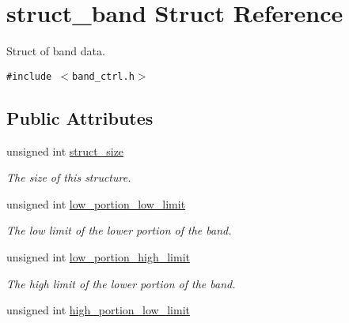 \hypertarget{structstruct__band}{
\section{struct\_\-band Struct Reference}
\label{structstruct__band}
}
Struct of band data.  


{\tt \#include $<$band\_\-ctrl.h$>$}

\subsection*{Public Attributes}
\begin{CompactItemize}
\item 
\hypertarget{structstruct__band_bb380407371d94a3d587953e8894fd07}{
unsigned int \hyperlink{structstruct__band_bb380407371d94a3d587953e8894fd07}{struct\_\-size}}
\label{structstruct__band_bb380407371d94a3d587953e8894fd07}

\begin{CompactList}\small\item\em The size of this structure. \item\end{CompactList}\item 
\hypertarget{structstruct__band_3a22e17c781330ff1c74ba3937827859}{
unsigned int \hyperlink{structstruct__band_3a22e17c781330ff1c74ba3937827859}{low\_\-portion\_\-low\_\-limit}}
\label{structstruct__band_3a22e17c781330ff1c74ba3937827859}

\begin{CompactList}\small\item\em The low limit of the lower portion of the band. \item\end{CompactList}\item 
\hypertarget{structstruct__band_5d49885cc511be8fa45b305f7cab7355}{
unsigned int \hyperlink{structstruct__band_5d49885cc511be8fa45b305f7cab7355}{low\_\-portion\_\-high\_\-limit}}
\label{structstruct__band_5d49885cc511be8fa45b305f7cab7355}

\begin{CompactList}\small\item\em The high limit of the lower portion of the band. \item\end{CompactList}\item 
\hypertarget{structstruct__band_5a0163b339f55c2290f39fb33080ecbf}{
unsigned int \hyperlink{structstruct__band_5a0163b339f55c2290f39fb33080ecbf}{high\_\-portion\_\-low\_\-limit}}
\label{structstruct__band_5a0163b339f55c2290f39fb33080ecbf}


\end{CompactItemize}
